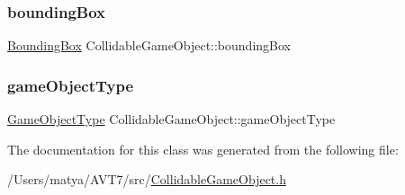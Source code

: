 \subsubsection{\texorpdfstring{bounding\+Box}{boundingBox}}
{\footnotesize\ttfamily \hyperlink{class_bounding_box}{Bounding\+Box} Collidable\+Game\+Object\+::bounding\+Box}

\mbox{\label{class_collidable_game_object_a5c79dc25d987f169a79c2c161e1a79dd}} 
\subsubsection{\texorpdfstring{game\+Object\+Type}{gameObjectType}}
{\footnotesize\ttfamily \hyperlink{_game_object_8h_a57678b60d65afb213d04a6b090c64a08}{Game\+Object\+Type} Collidable\+Game\+Object\+::game\+Object\+Type}



The documentation for this class was generated from the following file\+:\begin{DoxyCompactItemize}
\item 
/\+Users/matya/\+A\+V\+T7/src/\hyperlink{_collidable_game_object_8h}{Collidable\+Game\+Object.\+h}\end{DoxyCompactItemize}
